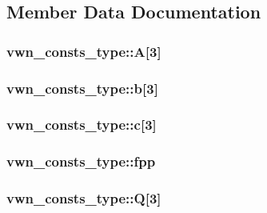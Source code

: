 \subsection{Member Data Documentation}
\hypertarget{structvwn__consts__type_a0d4afdb240cf0e88adc10263484e669d}{
\subsubsection[{A}]{ vwn\-\_\-consts\-\_\-type\-::\-A\mbox{[}3\mbox{]}}}\label{structvwn__consts__type_a0d4afdb240cf0e88adc10263484e669d}
\hypertarget{structvwn__consts__type_a400c6e16583ca34d2ea7935a07ab760c}{
\subsubsection[{b}]{ vwn\-\_\-consts\-\_\-type\-::b\mbox{[}3\mbox{]}}}\label{structvwn__consts__type_a400c6e16583ca34d2ea7935a07ab760c}
\hypertarget{structvwn__consts__type_aa47487414e28e21b4f6e93ef88ca9627}{
\subsubsection[{c}]{ vwn\-\_\-consts\-\_\-type\-::c\mbox{[}3\mbox{]}}}\label{structvwn__consts__type_aa47487414e28e21b4f6e93ef88ca9627}
\hypertarget{structvwn__consts__type_afb58612321d6a9cba940af5776e59b0f}{
\subsubsection[{fpp}]{ vwn\-\_\-consts\-\_\-type\-::fpp}}\label{structvwn__consts__type_afb58612321d6a9cba940af5776e59b0f}
\hypertarget{structvwn__consts__type_acad32412ba3c30a193fddfe0ab81466a}{
\subsubsection[{Q}]{ vwn\-\_\-consts\-\_\-type\-::\-Q\mbox{[}3\mbox{]}}}\label{structvwn__consts__type_acad32412ba3c30a193fddfe0ab81466a}
